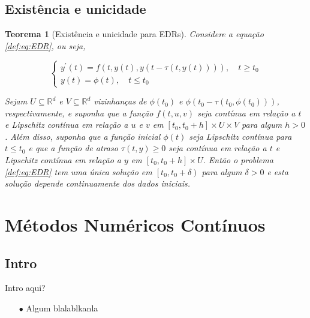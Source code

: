 \documentclass{beamer}
\theoremstyle{plain}
\newtheorem{teo}{Teorema}
\theoremstyle{definition}
\begin{document}
\subsection{Existência e unicidade}
\begin{frame}
     
\begin{teo}[Existência e unicidade para EDRs]
  \label{teo:local_existence:EDR}
  \small
  Considere a equação \eqref{def:eq:EDR}, ou seja,

  \[
    \left\{\begin{array}{l}
        y^{\prime}(t)=f(t, y(t), y(t-\tau(t, y(t)))), \quad t \geq t_{0}  \\
        y(t)=\phi(t), \quad t \leq t_{0}
    \end{array}\right.
  \]

  Sejam \(U \subseteq \mathbb{R}^{d}\) e \(V \subseteq \mathbb{R}^{d}\) vizinhanças de \(\phi\left(t_{0}\right)\) e \(\phi\left(t_{0}-\tau\left(t_{0}, \phi\left(t_{0}\right)\right)\right)\), respectivamente, e suponha que a função \(f(t, u, v)\) seja contínua em relação a \(t\) e Lipschitz contínua em relação a \(u\) e \(v\) em \(\left[t_{0}, t_{0}+h\right] \times U \times V\) para algum \(h>0\). Além disso, suponha que a função inicial \(\phi(t)\) seja Lipschitz contínua para \(t \leq t_{0}\) e que a função de atraso \(\tau(t, y) \geq 0\) seja contínua em relação a \(t\) e Lipschitz contínua em relação a \(y\) em \(\left[t_{0}, t_{0}+h\right] \times U\). Então o problema \ref{def:eq:EDR} tem uma única solução em \(\left[t_{0}, t_{0}+\delta\right)\) para algum \(\delta>0\) e esta solução depende continuamente dos dados iniciais.

\end{teo}
\end{frame}


\section{Métodos Numéricos Contínuos}

\subsection{Intro}

\begin{frame}{Intro aqui?}
    \begin{itemize}
        \item[$\bullet$] Algum blalablkanla
    \end{itemize} 
\end{frame}
\end{document}
